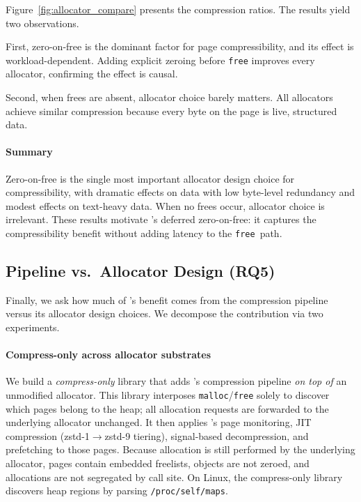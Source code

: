 Figure~\ref{fig:allocator_compare} presents the compression ratios.
The results yield two observations.

First, zero-on-free is the dominant factor for page compressibility,
and its effect is workload-dependent.  Adding explicit zeroing before
\texttt{free} improves every allocator, confirming the effect is
causal.

Second, when frees are absent, allocator choice barely matters.
All allocators achieve similar compression because every byte on the
page is live, structured data.

\paragraph{Summary}
Zero-on-free is the single most important allocator design choice
for compressibility, with dramatic effects on data with low
byte-level redundancy and modest effects on text-heavy data.
When no frees occur, allocator choice is irrelevant.
These results motivate \sys's deferred zero-on-free: it captures the
compressibility benefit without adding latency to the
\texttt{free}~path.

\subsection{Pipeline vs.\ Allocator Design (RQ5)}
\label{sec:eval:pipeline}

Finally, we ask how much of \sys's benefit comes from the
compression pipeline versus its allocator design choices.
We decompose the contribution via two experiments.

\paragraph{Compress-only across allocator substrates}
We build a \emph{compress-only}
library
that adds \sys's compression pipeline \emph{on top of} an
unmodified allocator.  This library interposes
\texttt{malloc}/\texttt{free} solely to discover which pages
belong to the heap; all allocation requests are forwarded to
the underlying allocator unchanged.  It then applies \sys's page monitoring,
JIT compression (zstd-1$\to$zstd-9 tiering), signal-based
decompression, and prefetching to those pages.  Because allocation is still performed
by the underlying allocator, pages contain embedded freelists, objects are
not zeroed, and allocations are not segregated by call site.
On Linux, the compress-only library discovers heap regions by
parsing \texttt{/proc/self/maps}.

